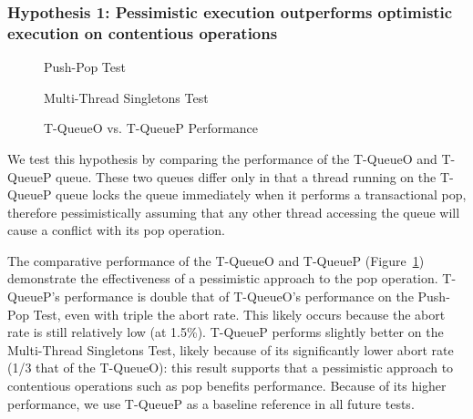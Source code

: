 \subsubsection{Hypothesis 1: Pessimistic execution outperforms optimistic execution on contentious operations}
\begin{figure}[H]
    \centering
	\begin{minipage}{0.75\textwidth}
        \caption*{Push-Pop Test}
        \vspace{12pt}
	\end{minipage}
	\begin{minipage}{0.75\textwidth}
        \caption*{Multi-Thread Singletons Test}
	\end{minipage}
    \caption{T-QueueO vs. T-QueueP Performance}
    \label{fig:stoqs}
\end{figure}


We test this hypothesis by comparing the performance of the T-QueueO and T-QueueP queue. These two queues differ only in that a thread running on the T-QueueP queue locks the queue immediately when it performs a transactional pop, therefore pessimistically assuming that any other thread accessing the queue will cause a conflict with its pop operation.

The comparative performance of the T-QueueO and T-QueueP (Figure~\ref{fig:stoqs}) demonstrate the effectiveness of a pessimistic approach to the pop operation. T-QueueP's performance is double that of T-QueueO's performance on the Push-Pop Test, even with triple the abort rate. This likely occurs because the abort rate is still relatively low (at 1.5\%). T-QueueP performs slightly better on the Multi-Thread Singletons Test, likely because of its significantly lower abort rate (1/3 that of the T-QueueO): this result supports that a pessimistic approach to contentious operations such as pop benefits performance. Because of its higher performance, we use T-QueueP as a baseline reference in all future tests.

\vspace{12pt}
\noindent{}

